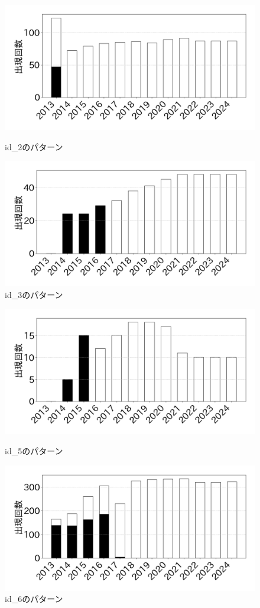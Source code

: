 \documentclass[11pt]{jreport}
\begin{document}
\begin{figure}[h]
    \centering
        \includegraphics[width=0.8\linewidth]{@BSthesis2024_Noguchi/Noguchi_fig/id_2.png}
        \vspace{-4mm}
        \caption{id\_2のパターン}
        \label{table:id_2}
        \includegraphics[width=0.8\linewidth]{@BSthesis2024_Noguchi/Noguchi_fig/id_3.png}
        \vspace{-2mm}
        \caption{id\_3のパターン}
        \label{table:id_3}
\end{figure}
\begin{figure}[h]
    \centering
        \includegraphics[width=0.8\linewidth]{@BSthesis2024_Noguchi/Noguchi_fig/id_5.png}
        \caption{id\_5のパターン}
        \label{table:id_5}

        \includegraphics[width=0.8\linewidth]{@BSthesis2024_Noguchi/Noguchi_fig/id_6.png}
        \caption{id\_6のパターン}
        \label{table:id_6}
\end{figure}
\end{document}
